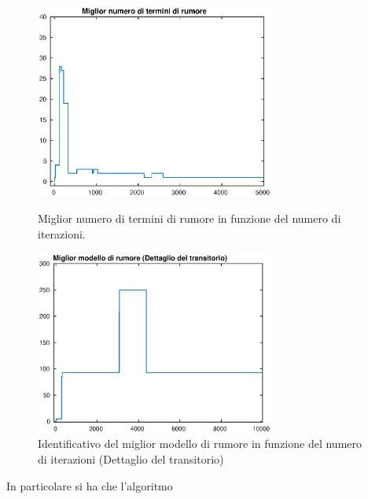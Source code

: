 \documentclass[10pt,a4paper,oneside,openany,noindent]{report}
\begin{document}
\begin{figure}[ht]
\quad
\centering
\begin{minipage}[t]{0.45\linewidth}

\includegraphics[width=0.7\textwidth]{modesq.eps} 
\caption{Miglior numero di termini di rumore in funzione del numero di iterazioni.   }
\label{fig:minipage1}
\end{minipage}
\quad
\begin{minipage}[t]{0.45\linewidth}
\centering
\includegraphics[width=0.7\textwidth]{BestModelNTransitorio.eps}
\caption{Identificativo del miglior  modello di rumore in funzione del numero di iterazioni (Dettaglio del transitorio)}
\label{fig:minipage2}
\end{minipage}
\end{figure}
In particolare si ha che l'algoritmo 
\end{document}
